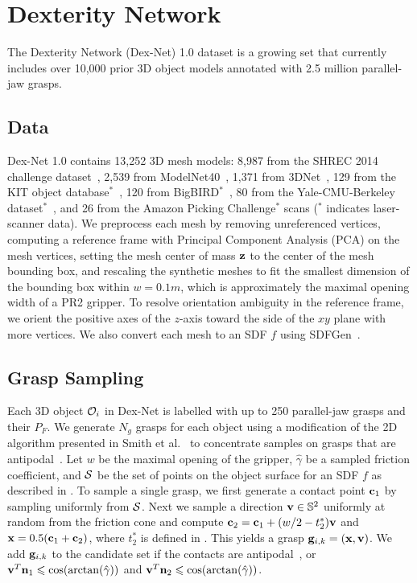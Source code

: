\section{Dexterity Network}

The Dexterity Network (Dex-Net) 1.0 dataset is a growing set that currently includes over 10,000 prior 3D object models annotated with 2.5 million parallel-jaw grasps.

\subsection{Data}
Dex-Net 1.0 contains 13,252 3D mesh models: 8,987 from the SHREC 2014 challenge dataset~\cite{li2015comparison}, 2,539 from ModelNet40~\cite{wu20153d}, 1,371 from 3DNet~\cite{wohlkinger20123dnet}, 129 from the KIT object database$^*$~\cite{kasper2012kit}, 120 from BigBIRD$^*$~\cite{singh2014bigbird}, 80 from the Yale-CMU-Berkeley dataset$^*$~\cite{calli2015benchmarking}, and 26 from the Amazon Picking Challenge$^*$ scans ($^*$ indicates laser-scanner data).
We preprocess each mesh by removing unreferenced vertices, computing a reference frame with Principal Component Analysis (PCA) on the mesh vertices, setting the mesh center of mass $\mathbf{z}$ to the center of the mesh bounding box, and rescaling the synthetic meshes to fit the smallest dimension of the bounding box within $w = 0.1m$, which is approximately the maximal opening width of a PR2 gripper.
To resolve orientation ambiguity in the reference frame, we orient the positive axes of the $z$-axis toward the side of the $xy$ plane with more vertices. 
We also convert each mesh to an SDF $f$ using SDFGen~\cite{sdfgen}.

\subsection{Grasp Sampling}
Each 3D object $\mathcal{O}_i$ in Dex-Net is labelled with up to 250 parallel-jaw grasps and their $P_F$.
We generate $N_g$ grasps for each object using a modification of the 2D algorithm presented in Smith et al.~\cite{smith1999computing} to concentrate samples on grasps that are antipodal~\cite{mahler2015gp}.
Let $w$ be the maximal opening of the gripper, $\hat{\gamma}$ be a sampled friction coefficient, and $\mathcal{S}$ be the set of points on the object surface for an SDF $f$ as described in .
To sample a single grasp, we first generate a contact point $\mathbf{c}_1$ by sampling uniformly from $\mathcal{S}$.%
Next we sample a direction $\mathbf{v} \in \mathbb{S}^2$ uniformly at random from the friction cone and compute $\mathbf{c}_2 = \mathbf{c}_1 + (w / 2 - t_2^*) \mathbf{v}$ and $\mathbf{x} = 0.5 (\mathbf{c}_1 + \mathbf{c}_2)$, where $t_2^*$ is defined in .
This yields a grasp $\mathbf{g}_{i,k} = (\mathbf{x}, \mathbf{v})$.
We add $\mathbf{g}_{i,k}$ to the candidate set if the contacts are antipodal~\cite{mahler2015gp}, or $\mathbf{v}^T \mathbf{n}_1 \leqslant \cos(\arctan(\hat{\gamma}))$ and $\mathbf{v}^T \mathbf{n}_2 \leqslant \cos(\arctan(\hat{\gamma}))$.

